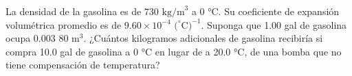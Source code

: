 \item La densidad de la gasolina es de $730\text{ kg/m}^3$ a 0 °C. Su coeficiente de expansión volumétrica promedio es de $9.60 \times 10^{-4} \text{ (}^\circ\text{C)}^{-1}$. Suponga que 1.00 gal de gasolina ocupa 0.003 80 m$^3$. ¿Cuántos kilogramos adicionales de gasolina recibiría si compra 10.0 gal de gasolina a 0 °C en lugar de a 20.0 °C, de una bomba que no tiene compensación de temperatura?

